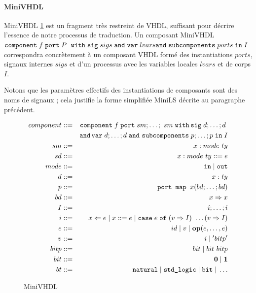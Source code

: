 \documentclass[a4paper]{article}
\newcommand{\p}[0]{\; \vert \;}
\newcommand{\mybox}[1]{\mbox{\tt{#1}}}
\newcommand{\Coloneqq}[0]{::=}
\newcommand{\coloneqq}[0]{::=}
\newcommand{\Op}[2]{\mybox{\bf{op}}(#1,\dots,#2)}
\newcommand{\Component}[6]{\mybox{component} \; #1 \; \mybox{port} \; #2 \; \
  \mybox{with} \; \mybox{sig} \; #3 \; \mybox{and} \; \mybox{var} \; #4 \; \\
  \mybox{and} \; \mybox{subcomponents} \; #5 \; \mybox{in} \; #6}
\newcommand{\Assign}[2]{#1 \Leftarrow #2}
\newcommand{\Affect}[2]{#1 \coloneqq #2}
\newcommand{\Case}[5]{\mybox{case} \; #1 \; \mybox{of} \; (#2 \Rightarrow #3) \
  \dots (#4 \Rightarrow #5)}
\begin{document}
\paragraph{MiniVHDL}

MiniVHDL \ref{fig:mvhdl} est un fragment tr\`es restreint de VHDL, suffisant pour
d\'ecrire l'essence de notre processus de traduction. Un composant MiniVHDL
$\Component{f}{P}{sigs}{lvars}{ports}{I}$ correspondra concr\`etement \`a un
composant VHDL form\'e des instantiations $ports$, signaux internes $sigs$ et d'un
processus avec les variables locales $lvars$ et de corps $I$.

Notons que les param\`etres effectifs des instantiations de composants sont des
noms de signaux ; cela justifie la forme simplifi\'ee MiniLS d\'ecrite au paragraphe
pr\'ec\'edent.

\begin{figure}[htp]
  \centering
  \begin{eqnarray*}
    component & \Coloneqq & \mybox{component} \; f \; \mybox{port} \; sm;\dots;\
    sm \; \mybox{with} \, \mybox{sig} \; d; \dots; d \; \\
    & & \mybox{and} \, \mybox{var} \; d; \dots; d \; \mybox{and} \
    \mybox{subcomponents} \; p; \dots; p \; \mybox{in} \; I \\
    sm & \Coloneqq & x : mode \ ty \\
    sd & \Coloneqq & x : mode \ ty \coloneqq e \\
    mode & \Coloneqq & \mybox{in} \p \mybox{out} \\
    d & \Coloneqq & x : ty \\
    p & \Coloneqq & \mybox{port map } x (bd;\dots;bd) \\
    bd & \Coloneqq & x \Rightarrow x \\
    I & \coloneqq & i; \dots; i \\
    i & \Coloneqq & \Assign{x}{e} \p \Affect{x}{e} \p \Case{e}{v}{I}{v}{I} \\
    e & \Coloneqq & id \; \vert \; v \; \vert \; \Op{e}{e} \\
    v & \Coloneqq & i \; \vert \; ' bitp ' \\
    bitp & \Coloneqq & bit \p bit \  bitp \\
    bit & \Coloneqq & \mathbf{0} \p \mathbf{1} \\
    bt & \Coloneqq & \mybox{natural} \p \mybox{std\_logic} \p \mybox{bit}
    \p \dots
  \end{eqnarray*}
  \caption{MiniVHDL}
  \label{fig:mvhdl}
\end{figure}
\end{document}
